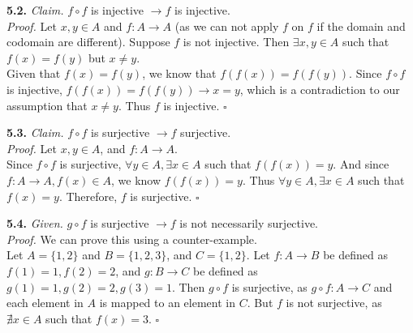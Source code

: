 \documentclass[11pt]{article}
\begin{document}
\vspace{15pt}

\noindent \textbf{5.2. } \emph{Claim. } $f \circ f$ is injective $\to f$ is injective. \medskip \\
\noindent \emph{Proof. } Let $x, y \in A$ and $f: A \to A$ (as we can not apply $f$ on $f$ if the domain and codomain are different). Suppose $f$ is not injective. Then $\exists x, y \in A$ such that $f(x) = f(y)$ but $x \neq y$. \\
Given that $f(x) = f(y)$, we know that $f(f(x)) = f(f(y))$. Since $f \circ f$ is injective, $f(f(x)) = f(f(y)) \rightarrow x = y$, which is a contradiction to our assumption that $x \neq y$. Thus $f$ is injective. \hfill $\square$

\vspace{15pt}

\noindent \textbf{5.3. } \emph{Claim. } $f \circ f$ is surjective $\to f$ surjective. \medskip \\
\noindent \emph{Proof. } Let $x, y \in A$, and $f: A \to A$.\\
Since $f \circ f$ is surjective, $\forall y \in A, \exists x \in A$ such that $f(f(x)) = y$. And since $f: A \to A, f(x) \in A$, we know $f(f(x)) = y$. Thus $\forall y \in A, \exists x \in A$ such that $f(x) = y$. Therefore, $f$ is surjective. \hfill $\square$



\vspace{15pt}

\noindent \textbf{5.4. } \emph{Given. } $g \circ f$ is surjective $\to f$ is not necessarily surjective. \medskip \\
\noindent \emph{Proof. } We can prove this using a counter-example. \\
Let $A = \{1, 2\}$ and $B = \{1, 2, 3\}$, and $C = \{1, 2\}$. Let $f: A \to B$ be defined as $f(1) = 1, f(2) = 2$, and $g: B \to C$ be defined as $g(1) = 1, g(2) = 2, g(3) = 1$. Then $g \circ f$ is surjective, as $g \circ f: A \to C$ and each element in $A$ is mapped to an element in $C$. But $f$ is not surjective, as $\nexists x \in A$ such that $f(x) = 3$. \hfill $\square$
\end{document}

